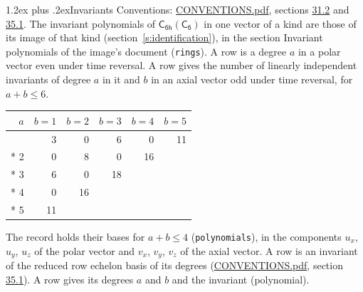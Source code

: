\documentclass[10pt,a4paper]{article}
\makeatletter
\renewcommand\section{\@startsection{section}{1}{\z@}{-3ex plus -1ex minus -.2ex}%
  {1.2ex plus .2ex}{\normalfont\large\sffamily\bfseries\color{parttitle}}}
\numberwithin{equation}{section}
\newcommand{\grp}[1]{\mathsf{#1}}
\makeatother
\begin{document}
\section{Invariants}\label{s:invariants}
Conventions: \href{../../CONVENTIONS.pdf}{CONVENTIONS.pdf}, sections \href{../../CONVENTIONS.pdf\#conv.31.2}{31.2} and \href{../../CONVENTIONS.pdf\#conv.35.1}{35.1}.
The invariant polynomials of $\grp{C_{6h}}(\grp{C_{6}})$ in one vector of a kind are those of its image of that kind (section~\ref{s:identification}), in the section Invariant polynomials of the image's document (\texttt{rings}).
\leavevmode\label{n:index.degree.polar}\label{n:index.degree.axial}A row is a degree $a$ in a polar vector even under time reversal. A row gives the number of linearly independent invariants of degree $a$ in it and $b$ in an axial vector odd under time reversal, for $a + b \le 6$.
{\small\begin{longtable}{@{}rrrrrr@{}}\toprule
$a$ & $b = 1$ & $b = 2$ & $b = 3$ & $b = 4$ & $b = 5$\\\midrule\endhead
\bottomrule\endfoot\endlastfoot
1 & 3 & 0 & 6 & 0 & 11\\*
2 & 0 & 8 & 0 & 16 & \\*
3 & 6 & 0 & 18 &  & \\*
4 & 0 & 16 &  &  & \\*
5 & 11 &  &  &  & \\
\bottomrule\end{longtable}}
\leavevmode\label{n:local.component.polar}\label{n:local.component.axial}The record holds their bases for $a + b \le 4$ (\texttt{polynomials}), in the components $u_{x}$, $u_{y}$, $u_{z}$ of the polar vector and $v_{x}$, $v_{y}$, $v_{z}$ of the axial vector. \label{n:head.polynomial}A row is an invariant of the reduced row echelon basis of its degrees (\href{../../CONVENTIONS.pdf}{CONVENTIONS.pdf}, section \href{../../CONVENTIONS.pdf\#conv.35.1}{35.1}). A row gives its degrees $a$ and $b$ and the invariant (polynomial).
\end{document}
